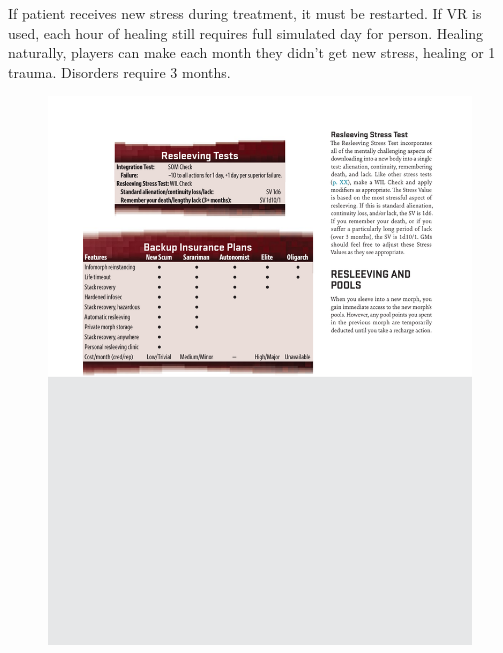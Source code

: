 \begin{itemize}
    \itembox If patient receives new stress during treatment, it must be restarted.
    \itembox If VR is used, each hour of healing still requires full simulated day for person.
    \itembox Healing naturally, players can make  each month they didn't get new
            stress, healing  or \num{1} trauma. Disorders require \num{3} months.
\end{itemize}


\begin{figure}[htbp!]%
   \centering
   \includegraphics[scale=0.84]{gfx/health-resleeving}%
\end{figure}%
